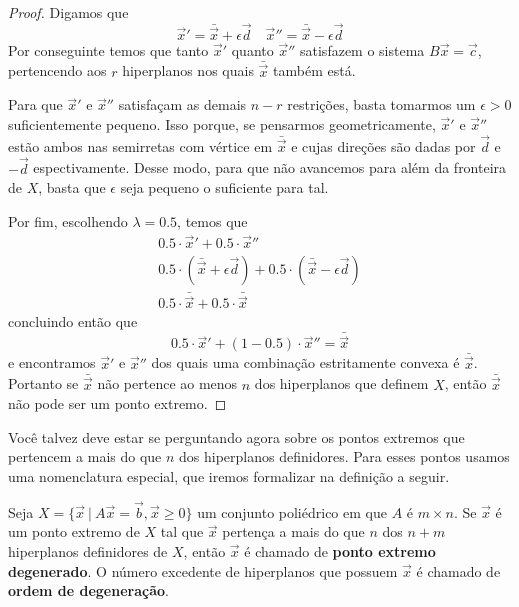 \begin{thm:ponto extremo}
\begin{proof}
		Digamos que
		\begin{equation*}
			\vec{x}' = \bar{\vec{x}} + \epsilon \vec{d}
			\quad
			\vec{x}'' = \bar{\vec{x}} - \epsilon \vec{d}
		\end{equation*}
		Por conseguinte temos que tanto $\vec{x}'$ quanto $\vec{x}''$ satisfazem o sistema
		$B\vec{x} = \vec{c}$, pertencendo aos $r$ hiperplanos nos quais
		$\bar{\vec{x}}$ também está.

		Para que $\vec{x}'$ e $\vec{x}''$ satisfaçam as demais $n - r$ restrições,
		basta tomarmos um $\epsilon > 0$ suficientemente pequeno. Isso porque, se
		pensarmos geometricamente,  $\vec{x}'$ e $\vec{x}''$ estão ambos nas semirretas
		com vértice em $\bar{\vec{x}}$ e cujas direções são dadas por $\vec{d}$ e $-\vec{d}$
		espectivamente. Desse modo, para que não avancemos para além da fronteira de $X$,
		basta que $\epsilon$ seja pequeno o suficiente para tal.

		Por fim, escolhendo $\lambda = 0.5$, temos que
		\begin{gather*}
			0.5 \cdot \vec{x}' + 0.5 \cdot \vec{x}'' \\
			0.5 \cdot (\bar{\vec{x}} + \epsilon \vec{d}) +
			0.5 \cdot (\bar{\vec{x}} - \epsilon \vec{d}) \\
			0.5 \cdot \bar{\vec{x}} + 0.5 \cdot \bar{\vec{x}}
		\end{gather*}
		concluindo então que
		\begin{equation*}
			0.5 \cdot \vec{x}' + (1 - 0.5) \cdot \vec{x}'' = \bar{\vec{x}}
		\end{equation*}
		e encontramos $\vec{x}'$ e $\vec{x}''$ dos quais uma combinação estritamente
		convexa é $\bar{\vec{x}}$. Portanto se $\bar{\vec{x}}$ não pertence ao
		menos $n$ dos hiperplanos que definem $X$, então $\bar{\vec{x}}$ não
		pode ser um ponto extremo.
	\end{proof}
\end{thm:ponto extremo}

Você talvez deve estar se perguntando agora sobre os pontos extremos que pertencem a
mais do que $n$ dos hiperplanos definidores. Para esses pontos usamos uma nomenclatura
especial, que iremos formalizar na definição a seguir.

\begin{def:ponto degenerado}
	Seja $X = \{\vec{x}\ |\ A\vec{x} = \vec{b}, \vec{x} \geq 0\}$ um conjunto
	poliédrico em que $A$ é $m \times n$. Se $\vec{x}$ é um ponto extremo de $X$
	tal que $\vec{x}$ pertença a mais do que $n$ dos $n + m$ hiperplanos definidores
	de $X$, então $\vec{x}$ é chamado de \textbf{ponto extremo degenerado}. O
	número excedente de hiperplanos que possuem $\vec{x}$ é chamado de
	\textbf{ordem de degeneração}.
\end{def:ponto degenerado}

